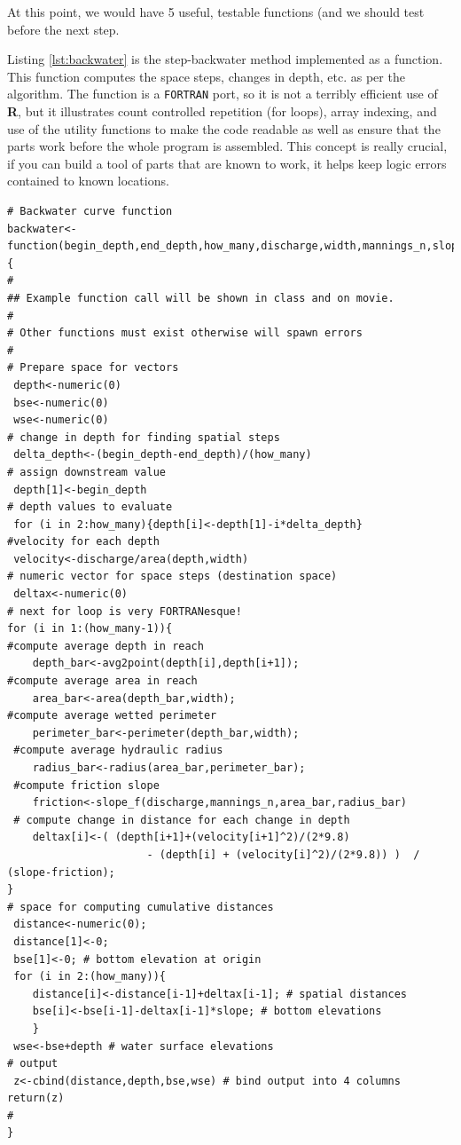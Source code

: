 At this point, we would have 5 useful, testable functions (and we should test before the next step.

Listing \ref{lst:backwater} is the step-backwater method implemented as a function.  
This function computes the space steps, changes in depth, etc. as per the algorithm.  
The function is a \texttt{FORTRAN} port, so it is not a terribly efficient use of \textbf{R}, but it illustrates count controlled repetition (for loops), array indexing, and use of the utility functions to make the code readable as well as ensure that the parts work before the whole program is assembled.  
This concept is really crucial, if you can build a tool of parts that are known to work, it helps keep logic errors contained to known locations.

\begin{lstlisting}[caption=R Code for prototype friction slope function) \\ , label=lst:backwater]
# Backwater curve function
backwater<-function(begin_depth,end_depth,how_many,discharge,width,mannings_n,slope){
#
## Example function call will be shown in class and on movie.
#
# Other functions must exist otherwise will spawn errors
#
# Prepare space for vectors
 depth<-numeric(0)  
 bse<-numeric(0) 
 wse<-numeric(0) 
# change in depth for finding spatial steps
 delta_depth<-(begin_depth-end_depth)/(how_many)  
# assign downstream value
 depth[1]<-begin_depth 
# depth values to evaluate
 for (i in 2:how_many){depth[i]<-depth[1]-i*delta_depth} 
#velocity for each depth
 velocity<-discharge/area(depth,width) 
# numeric vector for space steps (destination space)
 deltax<-numeric(0)
# next for loop is very FORTRANesque!  
for (i in 1:(how_many-1)){
#compute average depth in reach
    depth_bar<-avg2point(depth[i],depth[i+1]); 
#compute average area in reach
    area_bar<-area(depth_bar,width); 
#compute average wetted perimeter
    perimeter_bar<-perimeter(depth_bar,width);
 #compute average hydraulic radius 
    radius_bar<-radius(area_bar,perimeter_bar);
 #compute friction slope 
    friction<-slope_f(discharge,mannings_n,area_bar,radius_bar)
 # compute change in distance for each change in depth 
    deltax[i]<-( (depth[i+1]+(velocity[i+1]^2)/(2*9.8) 
                      - (depth[i] + (velocity[i]^2)/(2*9.8)) )  /  (slope-friction); 
}
# space for computing cumulative distances
 distance<-numeric(0); 
 distance[1]<-0;
 bse[1]<-0; # bottom elevation at origin
 for (i in 2:(how_many)){
	distance[i]<-distance[i-1]+deltax[i-1]; # spatial distances
	bse[i]<-bse[i-1]-deltax[i-1]*slope; # bottom elevations
	}
 wse<-bse+depth # water surface elevations
# output
 z<-cbind(distance,depth,bse,wse) # bind output into 4 columns
return(z)
#
}
\end{lstlisting} 


